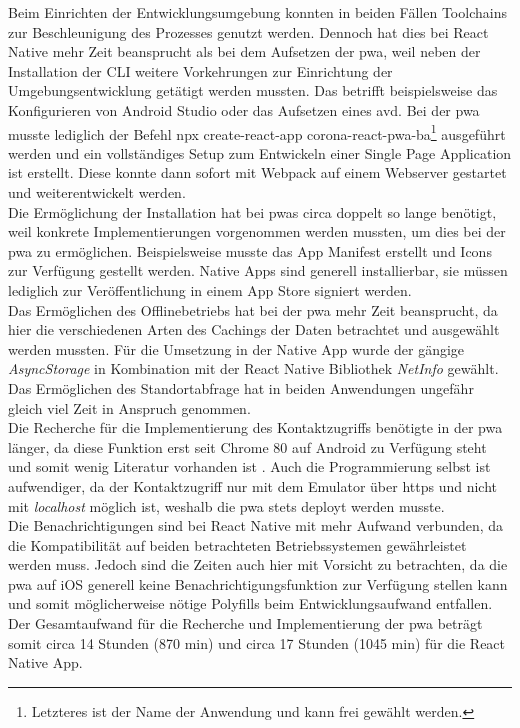 Beim Einrichten der Entwicklungsumgebung konnten in beiden Fällen Toolchains zur Beschleunigung des Prozesses genutzt werden.
Dennoch hat dies bei React Native mehr Zeit beansprucht als bei dem Aufsetzen der \ac{pwa}, weil neben der Installation der CLI weitere Vorkehrungen zur Einrichtung der Umgebungsentwicklung getätigt werden mussten.
Das betrifft beispielsweise das Konfigurieren von Android Studio oder das Aufsetzen eines \ac{avd}.
Bei der \ac{pwa} musste lediglich der Befehl \glqq npx create-react-app corona-react-pwa-ba\grqq{}\footnote{Letzteres ist der Name der Anwendung und kann frei gewählt werden.} ausgeführt werden und ein vollständiges Setup zum Entwickeln einer Single Page Application ist erstellt.
Diese konnte dann sofort mit Webpack auf einem Webserver gestartet und weiterentwickelt werden.\\
Die Ermöglichung der Installation hat bei \acp{pwa} circa doppelt so lange benötigt, weil konkrete Implementierungen vorgenommen werden mussten, um dies bei der \ac{pwa} zu ermöglichen.
Beispielsweise musste das App Manifest erstellt und Icons zur Verfügung gestellt werden.
Native Apps sind generell installierbar, sie müssen lediglich zur Veröffentlichung in einem App Store signiert werden.\\
Das Ermöglichen des Offlinebetriebs hat bei der \ac{pwa} mehr Zeit beansprucht, da hier die verschiedenen Arten des Cachings der Daten betrachtet und ausgewählt werden mussten.
Für die Umsetzung in der Native App wurde der gängige \textit{AsyncStorage} in Kombination mit der React Native Bibliothek \textit{NetInfo} gewählt.\\
Das Ermöglichen des Standortabfrage hat in beiden Anwendungen ungefähr gleich viel Zeit in Anspruch genommen.\\
Die Recherche für die Implementierung des Kontaktzugriffs benötigte in der \ac{pwa} länger, da diese Funktion erst seit Chrome 80 auf Android zu Verfügung steht und somit wenig Literatur vorhanden ist \cite{Beverloo.2021}.
Auch die Programmierung selbst ist aufwendiger, da der Kontaktzugriff nur mit dem Emulator über \ac{https} und nicht mit \textit{localhost} möglich ist, weshalb die \ac{pwa} stets deployt werden musste.\\
Die Benachrichtigungen sind bei React Native mit mehr Aufwand verbunden, da die Kompatibilität auf beiden betrachteten Betriebssystemen gewährleistet werden muss.
Jedoch sind die Zeiten auch hier mit Vorsicht zu betrachten, da die \ac{pwa} auf iOS generell keine Benachrichtigungsfunktion zur Verfügung stellen kann und somit möglicherweise nötige Polyfills beim Entwicklungsaufwand entfallen.\\
Der Gesamtaufwand für die Recherche und Implementierung der \ac{pwa} beträgt somit circa 14 Stunden (870 min) und circa 17 Stunden (1045 min) für die React Native App. 


